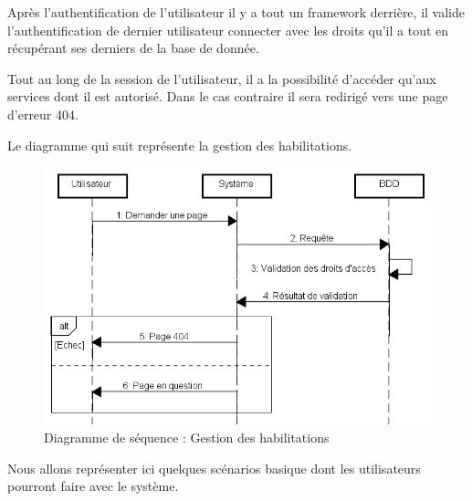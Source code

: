 Après l'authentification de l'utilisateur il y a tout un framework derrière, il valide l'authentification de dernier utilisateur connecter avec les droits qu'il a tout en récupérant ses derniers de la base de donnée.
\medskip

Tout au long de la session de l'utilisateur, il a la possibilité d'accéder qu'aux services dont il est autorisé. Dans le cas contraire il sera redirigé vers une page d'erreur 404.
\medskip

Le diagramme qui suit représente la gestion des habilitations.

\begin{figure}[h]
	\centering
	\includegraphics[width=1\linewidth]{"Chapitre3/images/sd/Gestion des habilitations"}
	\caption{Diagramme de séquence : Gestion des habilitations}
	\label{Diagramme de séquence : Gestion des habilitations}
\end{figure}

\clearpage

Nous allons représenter ici quelques scénarios basique dont les utilisateurs pourront faire avec le système. 

